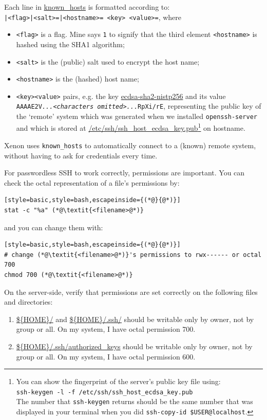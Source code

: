 \documentclass[12pt, a4paper, twoside, openany, titlepage]{book}
\begin{document}
Each line in  \url{known_hosts} is formatted according to: \\
\texttt{|<flag>|<salt>=|<hostname>= <key> <value>=}, where
\begin{itemize}
\item{\texttt{<flag>} is a flag. Mine says \texttt{1} to signify that the third element \texttt{<hostname>} is hashed using the SHA1 algorithm;}
\item{\texttt{<salt>} is the (public) salt used to encrypt the host name;}
\item{\texttt{<hostname>} is the (hashed) host name;}
\item{\texttt{<key>}\texttt{<value>} pairs, e.g. the key \url{ecdsa-sha2-nistp256} and its value\\ \texttt{AAAAE2V\textit{...<characters omitted>...}RpXi/rE}, representing the public key of the `remote' system which was generated when we installed \texttt{openssh-server} and which is stored at \url{/etc/ssh/ssh_host_ecdsa_key.pub}\footnote{You can show the fingerprint of the server's public key file using:\\
\texttt{ssh-keygen -l -f /etc/ssh/ssh\_host\_ecdsa\_key.pub}\\
The number that \texttt{ssh-keygen} returns should be the same number that was displayed in your terminal when you did \texttt{ssh-copy-id \${USER}@localhost}.} on hostname.}
\end{itemize}
Xenon uses \texttt{known\_hosts} to automatically connect to a (known) remote system, without having to ask for credentials every time.

For passwordless SSH to work correctly, permissions are important. You can check the octal representation of a file's permissions by:
\begin{lstlisting}[style=basic,style=bash,escapeinside={(*@}{@*)}]
stat -c "%a" (*@\textit{<filename>@*)}
\end{lstlisting}
and you can change them with:
\begin{lstlisting}[style=basic,style=bash,escapeinside={(*@}{@*)}]
# change (*@\textit{<filename>@*)}'s permissions to rwx------ or octal 700
chmod 700 (*@\textit{<filename>@*)}
\end{lstlisting}

On the server-side, verify that permissions are set correctly on the following files and directories:
\begin{enumerate}
\item{\url{${HOME}/} and \url{${HOME}/.ssh/} should be writable only by owner, not by group or all. On my system, I have octal permission 700. }
\item{\url{${HOME}/.ssh/authorized_keys} should be writable only by owner, not by group or all. On my system, I have octal permission 600. } %
\end{enumerate}
\end{document}
